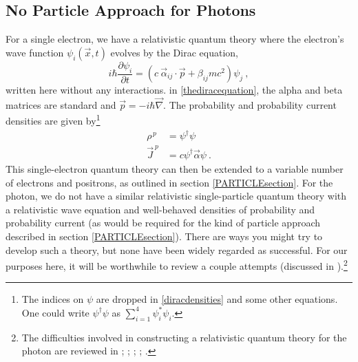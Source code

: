 \documentclass[onecolumn,secnumarabic,amsmath,amssymb,balancelastpage,nofootinbib]{article}
\newcommand{\del}[0]{\ensuremath{\vec{\nabla}}}
\begin{document}
\subsection{No Particle Approach for Photons}\label{PHOTONSsection}

For a single electron, we have a relativistic quantum theory where the electron's wave function $\psi_i(\vec{x},t)$ evolves by the Dirac equation,
\begin{equation}
i\hbar \frac{\partial \psi_i}{\partial t}=\left(c\:\vec{\alpha}_{ij}\cdot\vec{p}+\beta_{ij} m c^2 \right)\psi_j
\ ,
\label{thediracequation}
\end{equation}
written here without any interactions.  in \eqref{thediracequation}, the alpha and beta matrices are standard and $\vec{p}=-i\hbar\del$.  The probability and probability current densities are given by\footnote{The indices on $\psi$ are dropped in \eqref{diracdensities} and some other equations.  One could write $\psi^\dagger \psi$ as $\sum_{i=1}^4 \psi_i^*\psi_i$.}
\begin{align}
\rho^{\,p}&=\psi^\dagger \psi
\nonumber
\\
\vec{J}^{\:p}&=c \psi^\dagger \vec{\alpha} \psi
\ .
\label{diracdensities}
\end{align}
This single-electron quantum theory can then be extended to a variable number of electrons and positrons, as outlined in section \ref{PARTICLEsection}.  For the photon, we do not have a similar relativistic single-particle quantum theory with a relativistic wave equation and well-behaved densities of probability and probability current (as would be required for the kind of particle approach described in section \ref{PARTICLEsection}).  There are ways you might try to develop such a theory, but none have been widely regarded as successful.  For our purposes here, it will be worthwhile to review a couple attempts (discussed in \citealp{emasqp}).\footnote{The difficulties involved in constructing a relativistic quantum theory for the photon are reviewed in \citet[sec.\ II.5.2]{bohm1987}; \citet{holland1993}; \citet[sec.\ 12.6]{holland}; \citet{kiessling2018}; \citet[sec.\ 7.4]{valentini2020}.}
\end{document}
